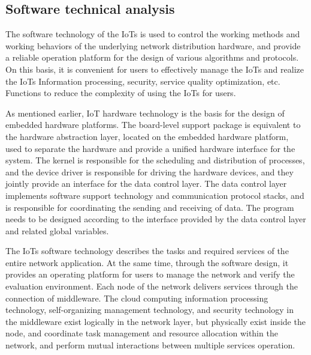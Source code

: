 \documentclass[a4paper,11pt]{article}
\begin{document}
\subsection{Software technical analysis}
The software technology of the IoTs is used to control the working methods and working behaviors of the underlying network distribution hardware, and provide a reliable operation platform for the design of various algorithms and protocols. On this basis, it is convenient for users to effectively manage the IoTs and realize the IoTs Information processing, security, service quality optimization, etc.
Functions to reduce the complexity of using the IoTs for users.

As mentioned earlier, IoT hardware technology is the basis for the design of embedded hardware platforms. The board-level support package is equivalent to the hardware abstraction layer, located on the embedded hardware platform, used to separate the hardware and provide a unified hardware interface for the system. The kernel is responsible for the scheduling and distribution of processes, and the device driver is responsible for driving the hardware devices, and they jointly provide an interface for the data control layer. The data control layer implements software support technology and communication protocol stacks, and is responsible for coordinating the sending and receiving of data. The program needs to be designed according to the interface provided by the data control layer and related global variables.

The IoTs software technology describes the tasks and required services of the entire network application. At the same time, through the software design, it provides an operating platform for users to manage the network and verify the evaluation environment. Each node of the network delivers services through the connection of middleware. The cloud computing information processing technology, self-organizing management technology, and security technology in the middleware exist logically in the network layer, but physically exist inside the node, and coordinate task management and resource allocation within the network, and perform mutual interactions between multiple services operation.
\end{document}
